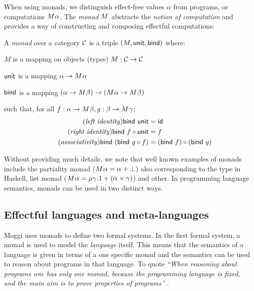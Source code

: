 When using monads, we distinguish effect-free values $\alpha$ from programs, or 
computations $M^{}\alpha$. The \emph{monad} $M^{}$ abstracts the \emph{notion of 
computation} and provides a way of constructing and composing effectful computations:

\begin{definition}
A \emph{monad} over a category $\mathcal{C}$ is a triple $(M, \textnormal{\sffamily unit}, \textnormal{\sffamily bind})$ where:
\begin{compactitem}
\item $M$ is a mapping on objects (types) $M : \mathcal{C} \rightarrow \mathcal{C}$
\item $\textnormal{\sffamily unit}$ is a mapping $\alpha \rightarrow M^{}\alpha$ 
\item $\textnormal{\sffamily bind}$ is a mapping $(\alpha \rightarrow M^{}\beta) 
  \rightarrow (M^{}\alpha \rightarrow M^{}\beta)$
\end{compactitem}
such that, for all $f:\alpha \rightarrow M^{}\beta, g:\beta \rightarrow M^{}\gamma$:
\begin{align}
\tag{\emph{left identity}}
  \ident{bind}~\ident{unit} &= \idf{}
  \\
\tag{\emph{right identity}}
  \ident{bind}~f \circ \ident{unit} &= f
  \\
\tag{\emph{associativity}}
  \ident{bind}~(\ident{bind}~g \circ f) &= (\ident{bind}~f) \circ (\ident{bind}~g)
\end{align}
\end{definition}

\noindent
Without providing much details, we note that well known examples of monads include the partiality
monad ($M^{}\alpha = \alpha + {\bot}$) also corresponding to the  type in 
Haskell, list monad ($M^{}\alpha = \mu \gamma.1 + (\alpha \times \gamma)$) and other.
In programming language semantics, monads can be used in two distinct ways.


\subsection{Effectful languages and meta-languages}
\label{sec:path-sem-langs}

Moggi uses monads to define two formal systems. In the first formal system, a monad is used to model 
the \emph{language} itself. This means that the semantics of a language is given in terms of a 
one specific monad and the semantics can be used to reason about programs in that language. To quote 
\emph{``When reasoning about programs one has only one monad, because the programming language is 
fixed, and the main aim is to prove properties of programs''} \cite[p. 5]{monad-notions}.

